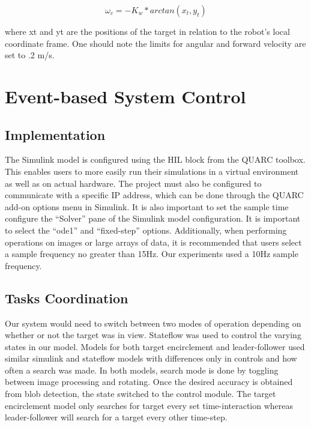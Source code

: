 \begin{equation}
	ω_c=-K_w*arctan⁡(x_t,y_t)
\end{equation}


where xt and yt are the positions of the target in relation to the robot’s local coordinate frame.
One should note the limits for angular and forward velocity are set to .2 m/s.



\section{Event-based System Control}
\subsection{Implementation}
The Simulink model is configured using the HIL block from the QUARC toolbox.  This enables users to more easily run their simulations in a virtual environment as well as on actual hardware.  The project must also be configured to communicate with a specific IP address, which can be done through the QUARC add-on options menu in Simulink.  It is also important to set the sample time configure the “Solver” pane of the Simulink model configuration.  It is important to select the “ode1” and “fixed-step” options.  Additionally, when performing operations on images or large arrays of data, it is recommended that users select a sample frequency no greater than 15Hz.  Our experiments used a 10Hz sample frequency.
\subsection{Tasks Coordination}
Our system would need to switch between two modes of operation depending on whether or not the target was in view.   Stateflow was used to control the varying states in our model. Models for both target encirclement and leader-follower used similar simulink and stateflow models with differences only in controls and how often a search was made. In both models, search mode is done by toggling between image processing and rotating. Once the desired accuracy is obtained from blob detection, the state switched to the control module.  The target encirclement model only searches for target every set time-interaction whereas leader-follower will search for a target every other time-step.

